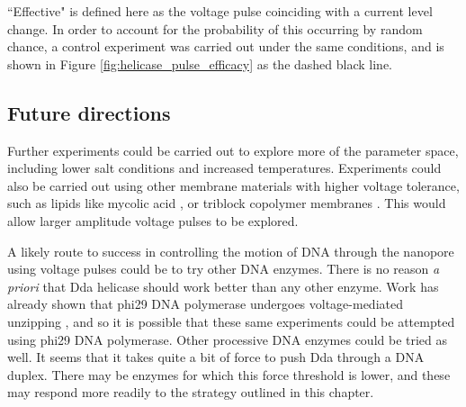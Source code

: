 ``Effective" is defined here as the voltage pulse coinciding with a current level change.  In order to account for the probability of this occurring by random chance, a control experiment was carried out under the same conditions, and is shown in Figure \ref{fig:helicase_pulse_efficacy} as the dashed black line.

\subsection{Future directions}

Further experiments could be carried out to explore more of the parameter space, including lower salt conditions and increased temperatures.  Experiments could also be carried out using other membrane materials with higher voltage tolerance, such as lipids like mycolic acid \citep{Langford2011}, or triblock copolymer membranes \citep{Nardin2000a, Gonzalez-Perez2009}.  This would allow larger amplitude voltage pulses to be explored.

A likely route to success in controlling the motion of DNA through the nanopore using voltage pulses could be to try other DNA enzymes.  There is no reason \textit{a priori} that Dda helicase should work better than any other enzyme.  Work has already shown that phi29 DNA polymerase undergoes voltage-mediated unzipping \citep{Cherf2012}, and so it is possible that these same experiments could be attempted using phi29 DNA polymerase.  Other processive DNA enzymes could be tried as well.  It seems that it takes quite a bit of force to push Dda through a DNA duplex.  There may be enzymes for which this force threshold is lower, and these may respond more readily to the strategy outlined in this chapter.
